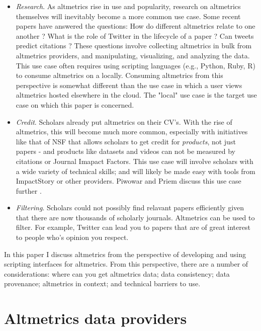 \documentclass[letterpaper,superscriptaddress,showkeys,longbibliography]{revtex4-1}\usepackage{graphicx, color}
\begin{document}
\begin{itemize}
  \item \emph{Research}. As altmetrics rise in use and popularity, research on altmetrics themselves will inevitably become a more common use case. Some recent papers have answered the questions: How do different altmetrics relate to one another \cite{yan2011,bollen2009}? What is the role of Twitter in the lifecycle of a paper \cite{darling2013}? Can tweets predict citations \cite{eysenbach2011}? These questions involve collecting altmetrics in bulk from altmetrics providers, and manipulating, visualizing, and analyzing the data. This use case often requires using scripting languages (e.g., Python, Ruby, R) to consume altmetrics on a locally. Consuming altmetrics from this perspective is somewhat different than the use case in which a user views altmetrics hosted elsewhere in the cloud. The "local" use case is the target use case on which this paper is concerned. 
  \item \emph{Credit}. Scholars already put altmetrics on their CV's. With the rise of altmetrics, this will become much more common, especially with initiatives like that of NSF that allows scholars to get credit for \emph{products}, not just papers - and products like datasets and videos can not be measured by citations or Journal Imapact Factors. This use case will involve scholars with a wide variety of technical skills; and will likely be made easy with tools from ImpactStory or other providers. Piwowar and Priem discuss this use case further \cite{piwowar2013power}. 
  \item \emph{Filtering}. Scholars could not possibly find relavant papers efficiently given that there are now thousands of scholarly journals. Altmetrics can be used to filter. For example, Twitter can lead you to papers that are of great interest to people who's opinion you respect.
\end{itemize}


In this paper I discuss altmetrics from the perspective of developing and using scripting interfaces for altmetrics. From this perspective, there are a number of considerations: where can you get altmetrics data; data consistency; data provenance; altmetrics in context; and technical barriers to use.

\section*{Altmetrics data providers}
\end{document}

